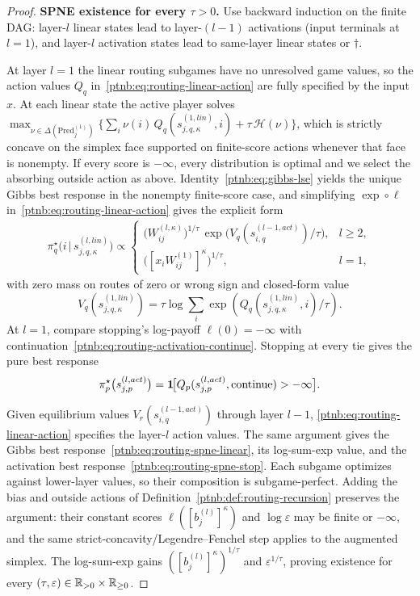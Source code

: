 \begin{proof}
\textbf{SPNE existence for every $\tau > 0$.} Use backward induction on the finite DAG:
layer-$l$ linear states lead to layer-$(l-1)$ activations (input terminals at $l=1$), and
layer-$l$ activation states lead to same-layer linear states or $\dagger$.

At layer $l=1$ the linear routing subgames have no unresolved game values, so the action values
$Q_q$ in~\eqref{ptnb:eq:routing-linear-action} are fully specified by the input $x$. At each linear
state the active player solves $\max_{\nu \in \Delta(\mathrm{Pred}_j^{(1)})} \{ \sum_i \nu(i)\,
    Q_q(s_{j,q,\kappa}^{(1, lin)}, i) + \tau\, \mathcal{H}(\nu) \}$, which is strictly concave on the simplex face supported on finite-score actions whenever that face is nonempty. If every score is $-\infty$, every distribution is optimal and we select the absorbing outside action as above. Identity~\eqref{ptnb:eq:gibbs-lse} yields the unique Gibbs best response in the nonempty finite-score case, and simplifying $\exp
    \circ \ell$ in~\eqref{ptnb:eq:routing-linear-action} gives the explicit form
\begin{align}\label{ptnb:eq:routing-spne-linear}
    \pi_q^\star\!\bigl(i \,\big|\, s_{j,q,\kappa}^{(l, lin)}\bigr)
    \propto
    \begin{cases}
        \bigl(W_{ij}^{(l,\kappa)}\bigr)^{1/\tau}\, \exp\!\bigl( V_q(s_{i,q}^{(l-1, act)})/\tau \bigr), & l
        \ge 2, \\[0.25em]
        \bigl([x_i W_{ij}^{(1)}]^\kappa\bigr)^{1/\tau}, & l = 1,
    \end{cases}
\end{align}
with zero mass on routes of zero or wrong sign and closed-form value
\begin{equation*}
    V_q(s_{j,q,\kappa}^{(1,lin)})
    = \tau \log \sum_i \exp(Q_q(s_{j,q,\kappa}^{(1,lin)},i)/\tau).
\end{equation*}
At $l=1$, compare stopping's log-payoff $\ell(0)=-\infty$ with
continuation~\eqref{ptnb:eq:routing-activation-continue}. Stopping at every tie gives the pure best response
\begin{align}\label{ptnb:eq:routing-spne-stop}
    \pi_p^\star\bigl(s_{j,p}^{(l, act)}\bigr)
    = \mathbf{1}\!\bigl[ Q_p(s_{j,p}^{(l, act)}, \mathrm{continue}) > -\infty \bigr].
\end{align}

Given equilibrium values $V_r(s_{i,q}^{(l-1,act)})$ through layer $l-1$,
\eqref{ptnb:eq:routing-linear-action} specifies the layer-$l$ action values. The same argument gives
the Gibbs best response~\eqref{ptnb:eq:routing-spne-linear}, its log-sum-exp value, and the activation
best response~\eqref{ptnb:eq:routing-spne-stop}. Each subgame optimizes against lower-layer values,
so their composition is subgame-perfect. Adding the bias and outside actions of
Definition~\ref{ptnb:def:routing-recursion} preserves the argument: their constant scores
$\ell([b_j^{(l)}]^\kappa)$ and $\log\varepsilon$ may be finite or $-\infty$, and the same
strict-concavity/Legendre--Fenchel step applies to the augmented simplex. The log-sum-exp gains
$([b_j^{(l)}]^\kappa)^{1/\tau}$ and $\varepsilon^{1/\tau}$, proving existence for every
$(\tau,\varepsilon)\in\mathbb{R}_{>0}\times\mathbb{R}_{\ge0}$.


\end{proof}
